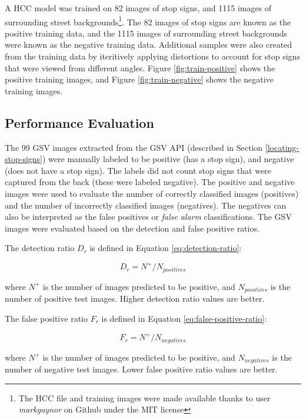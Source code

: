 A HCC model was trained on 82 images of stop signs, and 1115 images of surrounding street backgrounds\footnote{The HCC file and training images were made available thanks to user \textit{markgaynor} on Github under the MIT license}. The 82 images of stop signs are known as the positive training data, and the 1115 images of surrounding street backgrounds were known as the negative training data. Additional samples were also created from the training data by iteritively applying distortions to account for stop signs that were viewed from different angles. Figure \ref{fig:train-positive} shows the positive training images, and Figure \ref{fig:train-negative} shows the negative training images.

\subsection{Performance Evaluation} \label{performance-evaluation}

The 99 GSV images extracted from the GSV API (described in Section \ref{locating-stop-signs}) were manually labeled to be positive (has a stop sign), and negative (does not have a stop sign). The labels did not count stop signs that were captured from the back (these were labeled negative). The positive and negative images were used to evaluate the number of correctly classified images (positives) and the number of incorrectly classified images (negatives). The negatives can also be interpreted as the false positives or \textit{false alarm} classifications. The GSV images were evaluated based on the detection and false positive ratios.

The detection ratio $D_r$ is defined in Equation \ref{eq:detection-ratio}:

\begin{equation} \label{eq:detection-ratio}
D_r = N^+ / N_{positives}
\end{equation}

where $N^+$ is the number of images predicted to be positive, and $N_{positives}$ is the number of positive test images. Higher detection ratio values are better.

The false positive ratio $F_r$ is defined in Equation \ref{eq:false-positive-ratio}:

\begin{equation} \label{eq:false-positive-ratio}
F_r = N^+ / N_{negatives}
\end{equation}

where $N^+$ is the number of images predicted to be positive, and $N_{negatives}$ is the number of negative test images. Lower false positive ratio values are better.

